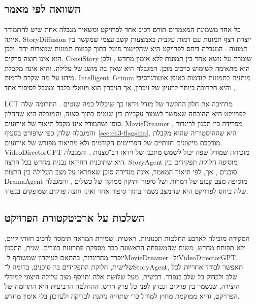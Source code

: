 \subsection{השוואה לפי מאמר}
כל אחד משמונת המאמרים תורם רכיב אחד לפרויקט ומשאיר מגבלה אחת שיש להתמודד איתה. \textenglish{StoryDiffusion} יוצרת רצף תמונות עם דמות עקבית באמצעות קשב עצמי שמקשר בין תמונות \cite{zhou2024storydiffusion}. המגבלה ביחס לפרויקט היא שהקישור פועל בתוך קבוצת תמונות שנוצרות יחד, ולכן הוא אינו חוצה פרקים. \textenglish{ConsiStory} שומרת על נושא אחד בין תמונות ללא אימון מחדש \cite{tewel2024consistory}, ולכן היא מתאימה לשימוש כרכיב מוכן. המגבלה היא שאין בה מושג של עלילה, והיא אינה מקבלת מידע על מה שקרה לדמות. \mbox{\textenglish{Intelligent Grimm}} מותנית בתמונות קודמות באופן אוטורגרסיבי \cite{liu2024grimm}, והיא הקרובה ביותר לרעיון של זיכרון, אך הזיכרון הוא ויזואלי בלבד ומוגבל לסיפור אחד.

\textenglish{LCT} מרחיבה את חלון ההקשר של מודל וידאו כך שיכלול כמה שוטים \cite{guo2025lct}. התרומה שלה לפרויקט היא ההוכחה שאפשר לשמור עקביות בין שוטים בתוך סצנה, והמגבלה היא שהחלון סופי ושהמודל אינו מקבל תיאור של אירועים. \textenglish{MovieDreamer} מפרידה בין תכנון לרינדור \cite{zhao2025moviedreamer}, והמגבלה שלה, כפי שיפורט בסעיף~\ref{sec:ch3-flagship}, היא שההיסטוריה שהיא מקבלת מורכבת מייצוגים חזותיים של הפריימים הקודמים ולא מתיאור מפורש של אירועים. \textenglish{VideoDirectorGPT} מוכיחה שמודל שפה יכול לשמש מתכנן של וידאו רב־סצנות \cite{lin2023videodirectorgpt}, והמגבלה היא שתוכנית הווידאו נבנית מחדש בכל הרצה. \textenglish{StoryAgent} מוסיפה חלוקת תפקידים בין סוכנים \cite{hu2024storyagent}, אך, לפי תיאור המאמר, אינה מגדירה סוכן שאחראי על מצב העלילה בין הרצות. \textenglish{DramaAgent} מוסיפה מצב קבוע של דמויות ושל סיפור ותיקון ממוקד של כשלים \cite{huang2026dramaagent}, והמגבלה שלה ביחס לפרויקט היא שהמצב נשמר בתוך סיפור אחד ואינו חוצה פרקים שמופקים בנפרד.

\subsection{השלכות על ארכיטקטורת הפרויקט}
הסקירה מובילה לארבע החלטות תכנוניות. ראשית, שמירת המראה תימסר לרכיב חזותי קיים, ולא תפותח מחדש, משום שהמשפחה הראשונה כבר מספקת פתרונות בוגרים. שנית, התכנון יופרד מהרינדור, בהתאם לעיקרון שמשותף ל־\textenglish{MovieDreamer} ול־\textenglish{VideoDirectorGPT}. שלישית, חלוקת התפקידים בין סוכנים, בדומה ל־\textenglish{StoryAgent}, תאפשר לבודד אחריות לכל שלב ולבדוק כל שלב בנפרד. רביעית, מעל שלושת אלה יתווסף מצב עלילה חיצוני למודלי היצירה, שנשמר בין פרקים ונבדק לפני כל פרק חדש. ההחלטה הרביעית היא התרומה של הפרויקט, והיא ממוקמת מחוץ למודל כדי שתהיה ניתנת לבדיקה ולעדכון בלי אימון מחדש.

